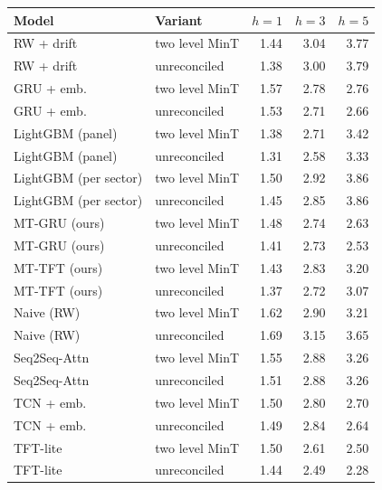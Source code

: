 \begin{tabular}{llrrr}
\toprule
Model & Variant & $h{=}1$ & $h{=}3$ & $h{=}5$ \\
\midrule
RW + drift & two level MinT & 1.44 & 3.04 & 3.77 \\
RW + drift & unreconciled & 1.38 & 3.00 & 3.79 \\
GRU + emb. & two level MinT & 1.57 & 2.78 & 2.76 \\
GRU + emb. & unreconciled & 1.53 & 2.71 & 2.66 \\
LightGBM (panel) & two level MinT & 1.38 & 2.71 & 3.42 \\
LightGBM (panel) & unreconciled & 1.31 & 2.58 & 3.33 \\
LightGBM (per sector) & two level MinT & 1.50 & 2.92 & 3.86 \\
LightGBM (per sector) & unreconciled & 1.45 & 2.85 & 3.86 \\
MT-GRU (ours) & two level MinT & 1.48 & 2.74 & 2.63 \\
MT-GRU (ours) & unreconciled & 1.41 & 2.73 & 2.53 \\
MT-TFT (ours) & two level MinT & 1.43 & 2.83 & 3.20 \\
MT-TFT (ours) & unreconciled & 1.37 & 2.72 & 3.07 \\
Naive (RW) & two level MinT & 1.62 & 2.90 & 3.21 \\
Naive (RW) & unreconciled & 1.69 & 3.15 & 3.65 \\
Seq2Seq-Attn & two level MinT & 1.55 & 2.88 & 3.26 \\
Seq2Seq-Attn & unreconciled & 1.51 & 2.88 & 3.26 \\
TCN + emb. & two level MinT & 1.50 & 2.80 & 2.70 \\
TCN + emb. & unreconciled & 1.49 & 2.84 & 2.64 \\
TFT-lite & two level MinT & 1.50 & 2.61 & 2.50 \\
TFT-lite & unreconciled & 1.44 & 2.49 & 2.28 \\
\bottomrule
\end{tabular}
